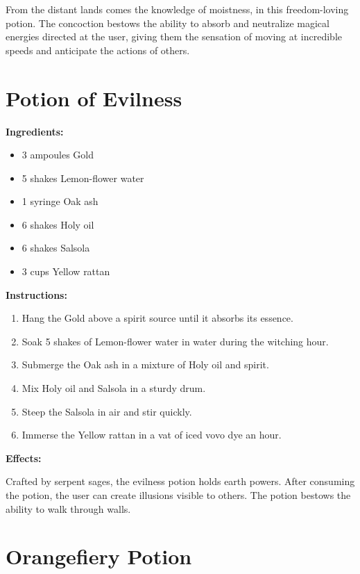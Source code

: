 \documentclass{article}
\begin{document}
From the distant lands comes the knowledge of moistness, in this freedom-loving potion. The concoction bestows the ability to absorb and neutralize magical energies directed at the user, giving them the sensation of moving at incredible speeds and anticipate the actions of others.

\newpage
\section*{Potion of Evilness}

\textbf{Ingredients:}

\begin{itemize}
  \item 3 ampoules Gold
  \item 5 shakes Lemon-flower water
  \item 1 syringe Oak ash
  \item 6 shakes Holy oil
  \item 6 shakes Salsola
  \item 3 cups Yellow rattan
\end{itemize}

\textbf{Instructions:}

\begin{enumerate}
  \item Hang the Gold above a spirit source until it absorbs its essence.
  \item Soak 5 shakes of Lemon-flower water in water during the witching hour.
  \item Submerge the Oak ash in a mixture of Holy oil and spirit.
  \item Mix Holy oil and Salsola in a sturdy drum.
  \item Steep the Salsola in air and stir quickly.
  \item Immerse the Yellow rattan in a vat of iced vovo dye an hour.
\end{enumerate}

\textbf{Effects:}

Crafted by serpent sages, the evilness potion holds earth powers. After consuming the potion, the user can create illusions visible to others. The potion bestows the ability to walk through walls.

\newpage
\section*{Orangefiery Potion}
\end{document}
